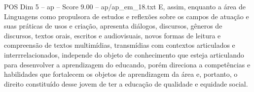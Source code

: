 \begin{textsample}{POS Dim 5 – ap – Score 9.00 – ap/ap\_em\_18.txt}
E, assim, enquanto a área de Linguagens como propulsora de estudos e reflexões sobre os campos de atuação e suas práticas de usos e criação, apresenta diálogos, discursos, gêneros de discursos, textos orais, escritos e audiovisuais, novos formas de leitura e compreensão de textos multimídias, transmídias com contextos articulados e interrrelacionados, independe do objeto de conhecimento que esteja articulando para desenvolver a aprendizagem do educando, porém direciona a competências e habilidades que fortalecem os objetos de aprendizagem da área e, portanto, o direito constituído desse jovem de ter a educação de qualidade e equidade social.

\end{textsample}
